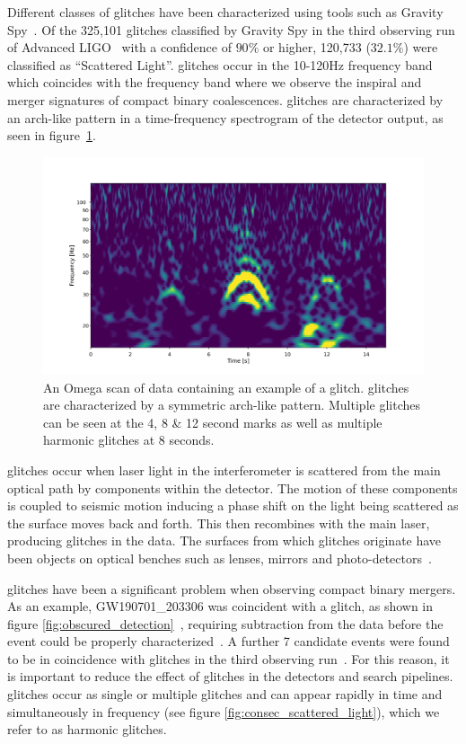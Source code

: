 Different classes of glitches have been characterized using tools such as Gravity Spy~\cite{gravityspy, GSpy_update}. Of the 325,101 glitches classified by Gravity Spy in the third observing run of Advanced LIGO~\cite{GSpy2022} with a confidence of $90\%$ or higher, 120,733 ($32.1\%$) were classified as ``Scattered Light''. \Scl{} glitches occur in the 10-120Hz frequency band~\cite{reducing_scattering_o3} which coincides with the frequency band where we observe the inspiral and merger signatures of compact binary coalescences. \Scl{} glitches are characterized by an arch-like pattern in a time-frequency spectrogram of the detector output, as seen in figure~\ref{fig:scattered_light}. 
%
\begin{figure}
  \includegraphics[width=\textwidth]{images/archenemy/Section1/single_stack.pdf}
  \caption{An Omega scan \cite{omegascan} of \gw{} data containing an example of a \scl{} glitch. \Scl{} glitches are characterized by a symmetric arch-like pattern. Multiple \scl{} glitches can be seen at the 4, 8 \& 12 second marks as well as multiple harmonic glitches at 8 seconds.}
  \label{fig:scattered_light}
\end{figure}
%
\Scl{} glitches occur when laser light in the interferometer is scattered from the main optical path by components within the detector. The motion of these components is coupled to seismic motion inducing a phase shift on the light being scattered as the surface moves back and forth. This \scl{} then recombines with the main laser, producing \scl{} glitches in the data. The surfaces from which \scl{} glitches originate have been objects on optical benches such as lenses, mirrors and photo-detectors~\cite{TAccadia}.

\Scl{} glitches have been a significant problem when observing compact binary mergers. As an example, GW190701\_203306 was coincident with a \scl{} glitch, as shown in figure \ref{fig:obscured_detection}~\cite{gwtc2}, requiring subtraction from the data before the event could be properly characterized~\cite{O3_subtraction}. A further 7 candidate events were found to be in coincidence with \scl{} glitches in the third observing run~\cite{gwtc3}. For this reason, it is important to reduce the effect of \scl{} glitches in the detectors and \gw{} search pipelines. \Scl{} glitches occur as single or multiple glitches and can appear rapidly in time and simultaneously in frequency (see figure \ref{fig:consec_scattered_light}), which we refer to as harmonic glitches.


